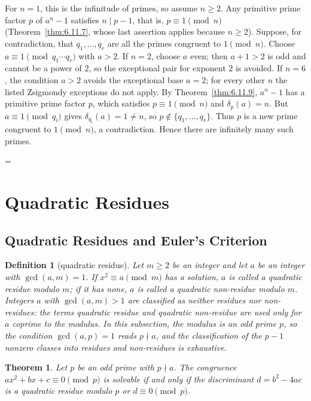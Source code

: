 \documentclass[11pt]{article}
\makeatletter
\theoremstyle{ntstyle}
\newtheorem{theorem}{Theorem}[subsection]
\newtheorem{definition}{Definition}[subsection]
\let\nt@closedisplay\]
\def\nt@guardedclose{\@ifnextchar\par{\nt@closeafterpar}{\@ifnextchar\end{\postdisplaypenalty\@M\nt@closedisplay}{\nt@closedisplay}}}
\def\nt@closeafterpar\par{\@ifnextchar\par{\nt@closeafterpar}{\@ifnextchar\end{\postdisplaypenalty\@M\nt@closedisplay\par}{\nt@closedisplay\par}}}
\renewenvironment{proof}[1][\proofname]{\par
  \pushQED{\qed}\normalfont\topsep\medskipamount\edef\nt@afterproof{\@endparpenalty=\the\@endparpenalty\relax}\@beginparpenalty\@M\@endparpenalty\@M\let\]\nt@guardedclose\trivlist\item[]\textit{#1\@addpunct{.}} \ignorespaces}{\ifvmode\addpenalty\@M\fi\popQED\nt@afterproof\endtrivlist\@endpefalse}
\makeatother
\begin{document}
\begin{proof} For $n = 1$, this is the infinitude of
	primes, so assume $n \ge 2$. Any primitive prime factor $p$ of $a^{n} -
		1$ satisfies $n \mid p - 1$, that is, $p \equiv 1 \pmod{n}$ (Theorem~\ref{thm:6.11.7}, whose last assertion applies because $n \ge 2$). Suppose, for contradiction, that $q_1, \ldots, q_r$ are all
	the primes congruent to $1 \pmod{n}$. Choose $a\equiv1\pmod{q_1\cdots q_r}$ with $a>2$. If $n=2$, choose $a$ even; then $a+1>2$ is odd and cannot be a power of $2$, so the exceptional pair for exponent $2$ is avoided. If $n=6$, the condition $a>2$ avoids the exceptional base $a=2$; for every other $n$ the listed Zsigmondy exceptions do not apply. By Theorem~\ref{thm:6.11.9}, $a^{n} - 1$ has a primitive
	prime factor $p$, which satisfies $p \equiv 1 \pmod{n}$ and
	$\delta_p(a) = n$. But $a \equiv 1 \pmod{q_i}$ gives
	$\delta_{q_i}(a) = 1 \neq n$, so $p \notin \{q_1, \ldots,
		q_r\}$. Thus $p$ is a new prime congruent to $1 \pmod{n}$, a contradiction. Hence there
	are infinitely many such primes.

\end{proof}
\newpage

\section{Quadratic Residues}

\subsection{Quadratic Residues and Euler's Criterion}

\begin{definition}[quadratic residue]\label{def:7.1.1} Let $m \ge 2$ be an integer and let
	$a$ be an integer with $\gcd(a, m) = 1$. If $x^{2} \equiv a \pmod{m}$
	has a solution, $a$ is called a quadratic residue modulo $m$; if it
	has none, $a$ is called a quadratic non-residue modulo $m$. Integers
	$a$ with $\gcd(a, m) > 1$ are classified as neither residues nor non-residues: the terms
	quadratic residue and quadratic non-residue are used only for $a$
	coprime to the modulus. In this subsection, the modulus is an odd prime
	$p$, so the condition $\gcd(a, p) = 1$ reads $p \nmid a$, and the
	classification of the $p-1$ nonzero classes into residues and
	non-residues is exhaustive.

\end{definition}
\begin{theorem}\label{thm:7.1.1} Let $p$ be an odd prime with $p \nmid a$. The congruence
	$ax^{2} + bx + c \equiv 0 \pmod{p}$ is solvable if and only if the
	discriminant $d = b^{2} - 4ac$ is a quadratic residue modulo $p$ or
	$d \equiv 0 \pmod{p}$.

\end{theorem}
\end{document}
